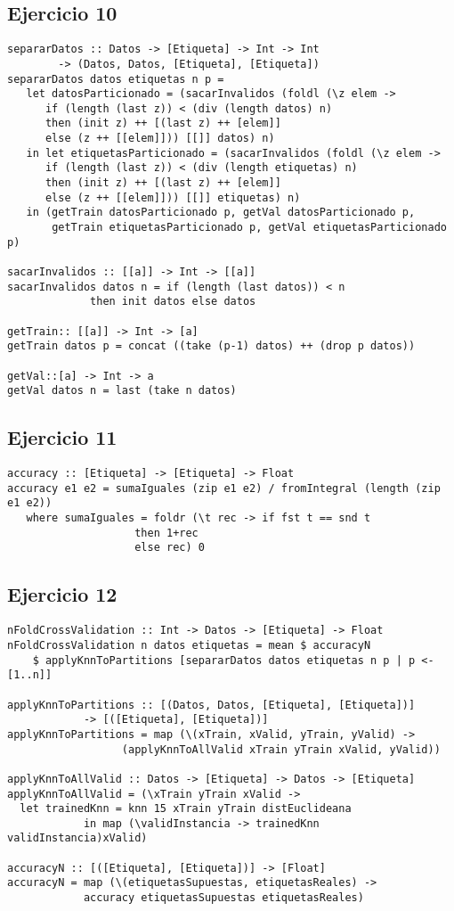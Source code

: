 \documentclass[spanish, 10pt,a4paper]{article}
\numberwithin{equation}{section} %
\begin{document}
\subsection{Ejercicio 10}
\begin{lstlisting}
separarDatos :: Datos -> [Etiqueta] -> Int -> Int 
		-> (Datos, Datos, [Etiqueta], [Etiqueta])
separarDatos datos etiquetas n p = 
   let datosParticionado = (sacarInvalidos (foldl (\z elem -> 
	  if (length (last z)) < (div (length datos) n) 
	  then (init z) ++ [(last z) ++ [elem]] 
	  else (z ++ [[elem]])) [[]] datos) n) 
   in let etiquetasParticionado = (sacarInvalidos (foldl (\z elem -> 
	  if (length (last z)) < (div (length etiquetas) n) 
	  then (init z) ++ [(last z) ++ [elem]] 
	  else (z ++ [[elem]])) [[]] etiquetas) n) 
   in (getTrain datosParticionado p, getVal datosParticionado p, 
       getTrain etiquetasParticionado p, getVal etiquetasParticionado p)

sacarInvalidos :: [[a]] -> Int -> [[a]]
sacarInvalidos datos n = if (length (last datos)) < n 
			 then init datos else datos

getTrain:: [[a]] -> Int -> [a]
getTrain datos p = concat ((take (p-1) datos) ++ (drop p datos))

getVal::[a] -> Int -> a
getVal datos n = last (take n datos)
\end{lstlisting}

\subsection{Ejercicio 11}
\begin{lstlisting}
accuracy :: [Etiqueta] -> [Etiqueta] -> Float
accuracy e1 e2 = sumaIguales (zip e1 e2) / fromIntegral (length (zip e1 e2)) 
   where sumaIguales = foldr (\t rec -> if fst t == snd t 
					then 1+rec 
					else rec) 0
\end{lstlisting}

\subsection{Ejercicio 12}
\begin{lstlisting}
nFoldCrossValidation :: Int -> Datos -> [Etiqueta] -> Float
nFoldCrossValidation n datos etiquetas = mean $ accuracyN 
	$ applyKnnToPartitions [separarDatos datos etiquetas n p | p <- [1..n]]

applyKnnToPartitions :: [(Datos, Datos, [Etiqueta], [Etiqueta])] 
			-> [([Etiqueta], [Etiqueta])]
applyKnnToPartitions = map (\(xTrain, xValid, yTrain, yValid) -> 
			      (applyKnnToAllValid xTrain yTrain xValid, yValid))  

applyKnnToAllValid :: Datos -> [Etiqueta] -> Datos -> [Etiqueta]
applyKnnToAllValid = (\xTrain yTrain xValid -> 
  let trainedKnn = knn 15 xTrain yTrain distEuclideana 
		    in map (\validInstancia -> trainedKnn validInstancia)xValid)

accuracyN :: [([Etiqueta], [Etiqueta])] -> [Float]
accuracyN = map (\(etiquetasSupuestas, etiquetasReales) -> 
			accuracy etiquetasSupuestas etiquetasReales) 
\end{lstlisting}
\end{document}
